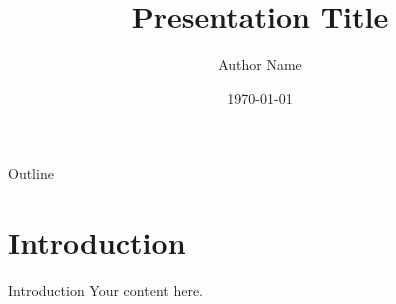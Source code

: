 \documentclass{beamer}
\title{Presentation Title}
\author{Author Name}
\date{\today}
\begin{document}
\frame{\titlepage}

\begin{frame}{Outline}
  \tableofcontents
\end{frame}

\section{Introduction}
\begin{frame}{Introduction}
  Your content here.
\end{frame}

\end{document}
